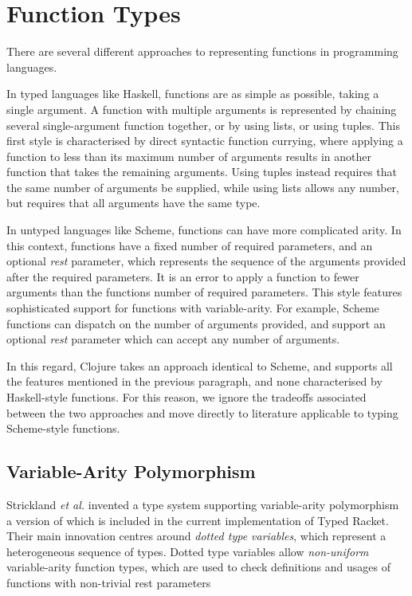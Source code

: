 \section{Function Types}

There are several different approaches to representing functions in programming languages.

In typed languages like Haskell, functions are as simple as possible, taking a single argument.
A function with multiple arguments is represented by chaining several single-argument function
together, or by using lists, or using tuples. This first style is characterised by direct syntactic function currying, where applying
a function to less than its maximum number of arguments results in another function
that takes the remaining arguments.
Using tuples instead requires that the same number of arguments be supplied,
while using lists allows any number, but requires that all arguments have the same type.

In untyped languages like Scheme, functions can have more complicated arity.
In this context, functions have a fixed number of required parameters, and an optional \emph{rest}
parameter, which represents the sequence of the arguments provided after the required parameters.
It is an error to apply a function to fewer arguments than the functions number of required parameters.
This style features sophisticated support for functions with variable-arity. For example,
Scheme functions can dispatch on the number of arguments provided, and support an optional \emph{rest} parameter
which can accept any number of arguments.

In this regard, Clojure takes an approach identical to Scheme, and supports all the features
mentioned in the previous paragraph, and none characterised by Haskell-style functions.
For this reason, we ignore the tradeoffs associated between the two approaches 
and move directly to literature applicable to typing Scheme-style functions.

\subsection{Variable-Arity Polymorphism}
\label{sec:variablearity}

Strickland \emph{et al.} invented a type system supporting variable-arity polymorphism ~\cite{STF09} %
a version of which is included in the current implementation of Typed Racket.
Their main innovation centres around \emph{dotted type variables}, which represent a heterogeneous sequence
of types. Dotted type variables allow \emph{non-uniform} variable-arity function types,
which are used to check definitions and usages of functions with non-trivial rest parameters

